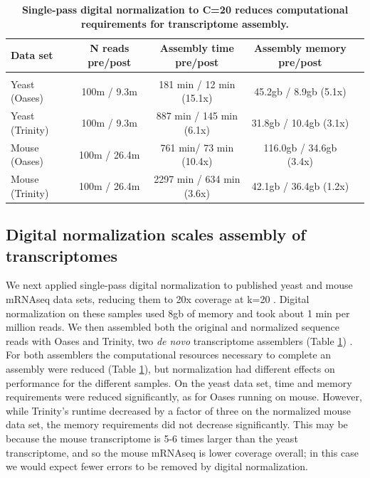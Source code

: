% 


\begin{table}[!ht]
\caption{
\bf{Single-pass digital normalization to C=20 reduces computational
requirements for transcriptome assembly.}}


\begin{tabular}{|l|c|c|c|c|}

Data set & N reads pre/post & Assembly time pre/post & Assembly memory pre/post \\
 \hline \\
Yeast (Oases) & 100m / 9.3m & 181 min / 12 min (15.1x) & 45.2gb / 8.9gb (5.1x) \\
Yeast (Trinity) & 100m / 9.3m & 887 min / 145 min (6.1x) & 31.8gb / 10.4gb (3.1x) \\
Mouse (Oases) & 100m / 26.4m & 761 min/ 73 min (10.4x) & 116.0gb / 34.6gb (3.4x) \\
Mouse (Trinity) & 100m / 26.4m & 2297 min / 634 min (3.6x) & 42.1gb / 36.4gb (1.2x) \\
\end{tabular}

\begin{flushleft}
\end{flushleft}
\label{tab:dntrans}
\end{table}


\subsection{Digital normalization scales assembly of transcriptomes}


We next applied single-pass digital normalization to published yeast and mouse
mRNAseq data sets, reducing them to 20x coverage at k=20 \cite{pubmed21572440}.
Digital normalization on these samples used 8gb of memory and took about 1 min
per million reads.  We then assembled both the original and normalized sequence
reads with Oases and Trinity, two {\em de novo} transcriptome assemblers (Table
\ref{tab:dntrans}) \cite{pubmed22368243,pubmed21572440}.
%
For both assemblers the computational resources necessary to complete an
assembly were reduced (Table \ref{tab:dntrans}), but normalization had
different effects on performance for the different samples.  On the yeast data
set, time and memory requirements were reduced significantly, as for Oases
running on mouse.  However, while Trinity's runtime decreased by a factor of
three on the normalized mouse data set, the memory requirements did not
decrease significantly.  This may be because the mouse transcriptome is 5-6
times larger than the yeast transcriptome, and so the mouse mRNAseq is lower
coverage overall; in this case we would expect fewer errors to be removed by
digital normalization.


